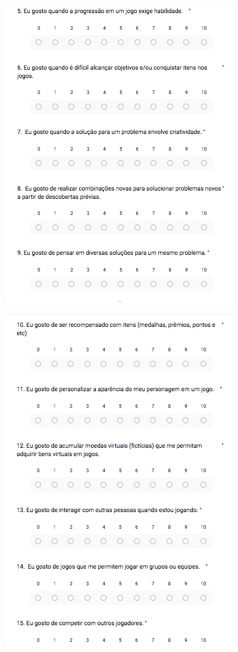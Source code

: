 \begin{apendicesenv}
\begin{figure}[h]
	\centering
	\includegraphics[keepaspectratio=true,scale=0.9]{figuras/q7.png}
\end{figure}

\begin{figure}[h]
	\centering
	\includegraphics[keepaspectratio=true,scale=0.9]{figuras/q8.png}
\end{figure}


\end{apendicesenv}
